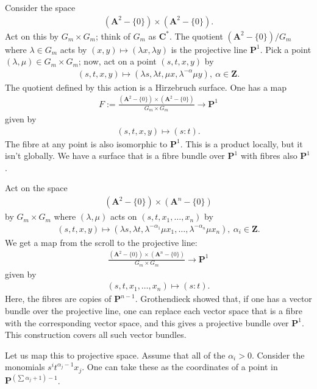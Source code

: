 \documentclass[11pt, oneside,margin=1in]{article}
\begin{document}
\begin{example}\label{}\text{}
Consider the space
\begin{align*}
	(\mathbf{A}^2 - \{0\}) \times (\mathbf{A}^2 - \{0\}).
\end{align*}
Act on this by $G_m\times G_m$; think of $G_m$ as $\mathbf{C}^*$. The quotient $(\mathbf{A}^2 - \{0\})/G_m$ where $\lambda \in G_m$ acts by $(x,y)\longmapsto  (\lambda x,\lambda y)$ is the projective line $\mathbf{P}^1$. Pick a point $(\lambda,\mu)\in  G_m\times G_m$; now, act on a point $(s,t,x,y)$ by
\begin{align*}
	(s,t,x,y)\longmapsto  (\lambda s, \lambda t,\mu x,\lambda^{-\alpha}\mu y),\ \alpha\in  \mathbf{Z}.
\end{align*}
The quotient defined by this action is a Hirzebruch surface. One has a map
\begin{align*}
	F := \frac{(\mathbf{A}^2-\{0\})\times (\mathbf{A}^2-\{0\})}{G_m\times G_m} \longrightarrow \mathbf{P}^1
\end{align*}
given by
\begin{align*}
	(s,t,x,y)\longmapsto  (s:t).
\end{align*}
The fibre at any point is also isomorphic to $\mathbf{P}^1$. This is a product locally, but it isn't globally. We have a surface that is a fibre bundle over $\mathbf{P}^1$ with fibres also $\mathbf{P}^1$.
\end{example}

\begin{example}[Scroll]\label{}\text{}
Act on the space
\begin{align*}
	(\mathbf{A}^2- \{0\}) \times (\mathbf{A}^n - \{0\})
\end{align*}
by $G_m\times G_m$ where $(\lambda,\mu)$ acts on $(s,t,x_1,\hdots, x_n)$ by 
\begin{align*}
	(s,t,x,y)\longmapsto  (\lambda s, \lambda t, \lambda^{-\alpha_1}\mu x_1,\hdots, \lambda^{-\alpha_n}\mu x_n), \ \alpha_i\in \mathbf{Z}.
\end{align*}
We get a map from the scroll to the projective line: 
\begin{align*}
	\frac{(\mathbf{A}^2-\{0\}) \times (\mathbf{A}^n-\{0\})}{G_m\times G_m} \longrightarrow \mathbf{P}^1
\end{align*}
given by
\begin{align*}
	(s,t,x_1,\hdots, x_n) \longmapsto (s:t).
\end{align*}
Here, the fibres are copies of $\mathbf{P}^{n-1}$. Grothendieck showed that, if one has a vector bundle over the projective line,  one can replace each vector space that is a fibre with the corresponding vector space, and this gives a projective bundle over $\mathbf{P}^1$. This construction covers all such vector bundles.

Let us map this to projective space. Assume that all of the $\alpha_i>0$. Consider the monomials $s^it^{\alpha_j-1}x_j$. One can take these as the coordinates of a point in $\mathbf{P}^{\left( \sum_{}^{} \alpha_j+1 \right) - 1}$.
\end{example}
\end{document}
